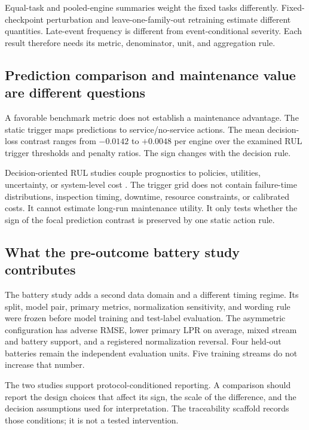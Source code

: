 \documentclass[preprint,12pt,numbers,sort&compress]{elsarticle}
\begin{document}
Equal-task and pooled-engine summaries weight the fixed tasks differently. Fixed-checkpoint perturbation and leave-one-family-out retraining estimate different quantities. Late-event frequency is different from event-conditional severity. Each result therefore needs its metric, denominator, unit, and aggregation rule.

\subsection{Prediction comparison and maintenance value are different questions}

A favorable benchmark metric does not establish a maintenance advantage. The static trigger maps predictions to service/no-service actions. The mean decision-loss contrast ranges from $-0.0142$ to $+0.0048$ per engine over the examined RUL trigger thresholds and penalty ratios. The sign changes with the decision rule.

Decision-oriented RUL studies couple prognostics to policies, utilities, uncertainty, or system-level cost \citep{Kamariotis2024DecisionMetric,Shi2025CredibilityPdM,He2026MaintenanceBenefit}. The trigger grid does not contain failure-time distributions, inspection timing, downtime, resource constraints, or calibrated costs. It cannot estimate long-run maintenance utility. It only tests whether the sign of the focal prediction contrast is preserved by one static action rule.

\subsection{What the pre-outcome battery study contributes}

The battery study adds a second data domain and a different timing regime. Its split, model pair, primary metrics, normalization sensitivity, and wording rule were frozen before model training and test-label evaluation. The asymmetric configuration has adverse RMSE, lower primary LPR on average, mixed stream and battery support, and a registered normalization reversal. Four held-out batteries remain the independent evaluation units. Five training streams do not increase that number.

The two studies support protocol-conditioned reporting. A comparison should report the design choices that affect its sign, the scale of the difference, and the decision assumptions used for interpretation. The traceability scaffold records those conditions; it is not a tested intervention.
\end{document}
